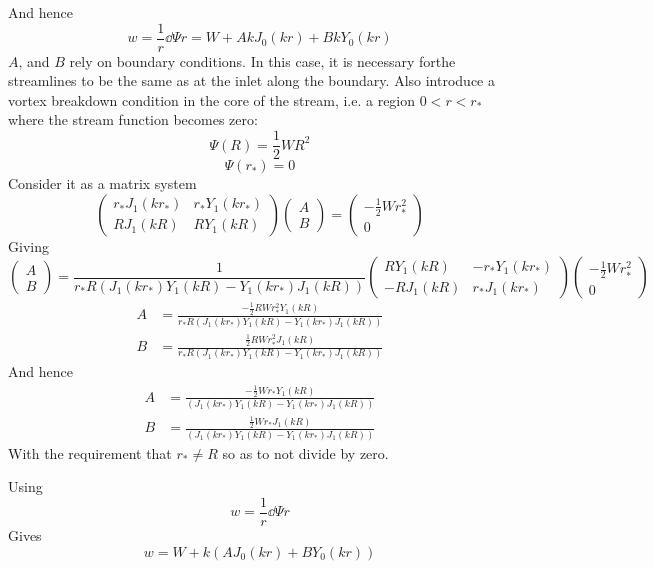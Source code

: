 \documentclass{X:/Documents/Coding/Latex/myreport}
\begin{document}
And hence
\[w = \frac1r \dd\Psi r = W + Ak J_0(kr) + Bk Y_0(kr)\]
$A$, and $B$ rely on boundary conditions. In this case, it is necessary forthe streamlines to be the same as at the inlet along the boundary. Also introduce a vortex breakdown condition in the core of the stream, i.e. a region $0<r<r_*$ where the stream function becomes zero:
\[\Psi(R) = \frac12 WR^2\]
\[\Psi(r_*) = 0 \]
Consider it as a matrix system
\[
\begin{pmatrix}
r_*J_1(kr_*) & r_*Y_1(kr_*)\\
RJ_1(kR) & RY_1(kR)
\end{pmatrix}\begin{pmatrix}
A\\B
\end{pmatrix} = 
\begin{pmatrix}
-\frac12 Wr_*^2\\0
\end{pmatrix}
\]
Giving
\[
\begin{pmatrix}
A\\B
\end{pmatrix} = 
\frac{1}{r_* R\left(J_1(kr_*)Y_1(kR) - Y_1(kr_*)J_1(kR)\right)}
\begin{pmatrix}
RY_1(kR) & -r_*Y_1(kr_*)\\
-RJ_1(kR) & r_*J_1(kr_*)
\end{pmatrix}
\begin{pmatrix}
-\frac12 Wr_*^2\\0
\end{pmatrix}
\]
\begin{align*}
    A&= \frac{-\frac12 RW r_*^2 Y_1(kR)}{r_*R\left(J_1(kr_*)Y_1(kR) - Y_1(kr_*)J_1(kR)\right)}\\
B&=\frac{\frac12 RW r_*^2 J_1(kR)}{r_*R\left(J_1(kr_*)Y_1(kR) - Y_1(kr_*)J_1(kR)\right)}
\end{align*}
And hence
\begin{align*}
    A&= \frac{-\frac12 W r_*Y_1(kR)}{\left(J_1(kr_*)Y_1(kR) - Y_1(kr_*)J_1(kR)\right)}\\
B&=\frac{\frac12 W r_* J_1(kR)}{\left(J_1(kr_*)Y_1(kR) - Y_1(kr_*)J_1(kR)\right)}
\end{align*}
With the requirement that $r_* \neq R$ so as to not divide by zero.


Using 
\[w = \frac1r \dd\Psi r\] 
Gives
\[w = W + k(AJ_0(kr) + BY_0(kr))\]
\end{document}
